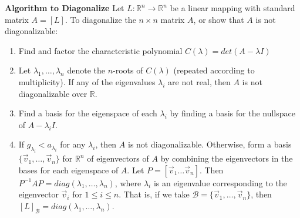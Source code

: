 \documentclass[10pt,letter]{article}
\begin{document}
\textbf{Algorithm to Diagonalize} Let $L:\mathbb{R}^n\rightarrow\mathbb{R}^n$ be a linear mapping with standard matrix $A=[L]$. To diagonalize the $n\times n$ matrix $A$, or show that $A$ is not diagonalizable: \begin{enumerate}
    \item Find and factor the characteristic polynomial $C(\lambda)=det(A-\lambda I)$ 
    \item Let $\lambda_1,\ldots,\lambda_n$ denote the $n$-roots of $C(\lambda)$ (repeated according to multiplicity). If any of the eigenvalues $\lambda_i$ are not real, then $A$ is not diagonalizable over $\mathbb{R}$. 
    \item Find a basis for the eigenspace of each $\lambda_i$ by finding a basis for the nullspace of $A-\lambda_iI$. 
    \item If $g_{\lambda_i}<a_{\lambda_i}$ for any $\lambda_i$, then $A$ is not diagonalizable. Otherwise, form a basis $\{\vec{v}_1,\ldots,\vec{v}_n\}$ for $\mathbb{R}^n$ of eigenvectors of $A$ by combining the eigenvectors in the bases for each eigenspace of $A$. Let $P=[\vec{v}_1\ldots\vec{v}_n]$. Then $P^{-1}AP=diag(\lambda_1,\ldots,\lambda_n)$, where $\lambda_i$ is an eigenvalue corresponding to the eigenvector $\vec{v}_i$ for $1\leq i\leq n$. That is, if we take $\mathcal{B}=\{\vec{v}_1,\ldots,\vec{v}_n\}$, then $[L]_\mathcal{B}=diag(\lambda_1,\ldots,\lambda_n)$.  
\end{enumerate}
\end{document}
